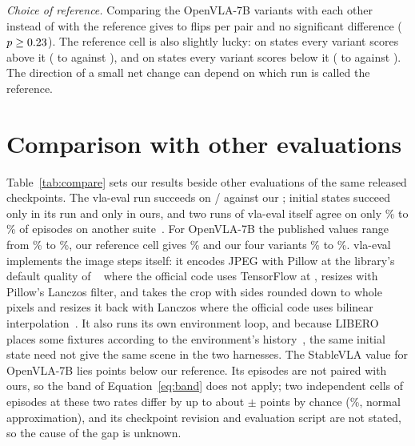 \emph{Choice of reference.} Comparing the OpenVLA-7B variants with each other instead of with the reference gives \SevVVfMin{} to \SevVVfMax{} flips per pair and no significant difference ($p \geq 0.23$). The reference cell is also slightly lucky: on states \SplitA{} every variant scores above it (\SevSplitVarAMin{} to \SevSplitVarAMax{} against \SevSplitRefA), and on states \SplitB{} every variant scores below it (\SevSplitVarBMin{} to \SevSplitVarBMax{} against \SevSplitRefB). The direction of a small net change can depend on which run is called the reference.

\section{Comparison with other evaluations}
\label{app:compare}



Table~\ref{tab:compare} sets our results beside other evaluations of the same released checkpoints. The vla-eval run succeeds on \VeK/\NPairs{} against our \SevRefK; \VeOnlyTheirs{} initial states succeed only in its run and \VeOnlyOurs{} only in ours, and two runs of vla-eval itself agree on only \ExtRoboscopeSelfLo\% to \ExtRoboscopeSelfHi\% of episodes on another suite~\citep{roboscope}. For OpenVLA-7B the published values range from \ExtStableClean\% to \ExtVeSpatial\%, our reference cell gives \SevRefPct\% and our four variants \SevVarMinPct\% to \SevVarMaxPct\%. vla-eval implements the image steps itself: it encodes JPEG with Pillow at the library's default quality of \ExtVeJpegQuality~\citep{pillow} where the official code uses TensorFlow at \JpegQuality, resizes with Pillow's Lanczos filter, and takes the crop with sides rounded down to whole pixels and resizes it back with Lanczos where the official code uses bilinear interpolation~\citep{vlaevalrepo}. It also runs its own environment loop, and because LIBERO places some fixtures according to the environment's history~\citep{issue342}, the same initial state need not give the same scene in the two harnesses. The StableVLA value for OpenVLA-7B lies \StableGapPts{} points below our reference. Its episodes are not paired with ours, so the band of Equation~\eqref{eq:band} does not apply; two independent cells of \NPairs{} episodes at these two rates differ by up to about $\pm$\StableUnpaired{} points by chance (\AlphaPct\%, normal approximation), and its checkpoint revision and evaluation script are not stated, so the cause of the gap is unknown.

